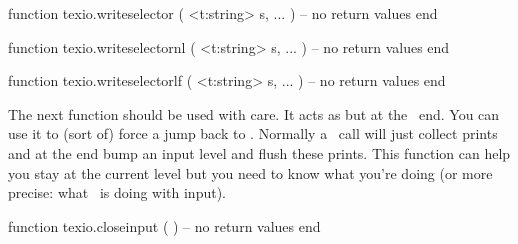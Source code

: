\starttyping[option=LUA]
function texio.writeselector ( <t:string> s, ... )
    -- no return values
end

function texio.writeselectornl ( <t:string> s, ... )
    -- no return values
end

function texio.writeselectorlf ( <t:string> s, ... )
    -- no return values
end
\stoptyping

The next function should be used with care. It acts as \type {\endinput} but at
the \LUA\ end. You can use it to (sort of) force a jump back to \TEX. Normally a
\LUA\ call will just collect prints and at the end bump an input level and flush
these prints. This function can help you stay at the current level but you need
to know what you're doing (or more precise: what \TEX\ is doing with input).

\starttyping[option=LUA]
function texio.closeinput ( )
    -- no return values
end
\stoptyping

%

\stopsection

\stopdocument

